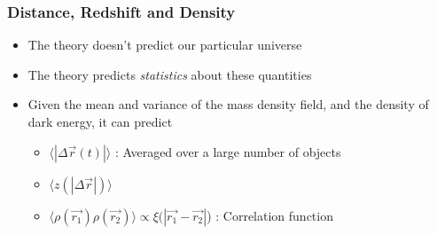\documentclass{beamer}
\begin{document}
\frame
{

    \frametitle{Distance, Redshift and Density}


    \begin{itemize}

        \item The theory doesn't predict our particular universe

        \item The theory predicts {\em statistics} about these quantities
            
        \item Given the mean and variance of the mass density field, and the
            density of dark energy, it can predict

            \begin{itemize}

                \item {\color{gold} $\langle |\Delta \vec{r} (t)| \rangle$ }: Averaged
                    over a large number of objects

                \item {\color{gold} $\langle z(|\Delta \vec{r}|) \rangle$}

                \item {\color{gold} $\langle \rho(\vec{r_1}) \rho(\vec{r_2})
                    \rangle \propto \xi(|\vec{r_1} - \vec{r_2}|$) }: Correlation function

            \end{itemize}

    \end{itemize}

}
\end{document}
